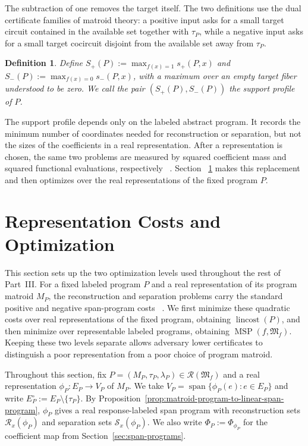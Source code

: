 \documentclass[11pt]{article}
\numberwithin{equation}{section}
\newtheorem{definition}{Definition}[section]
\theoremstyle{remark}
\begin{document}
The subtraction of one removes the target itself. The two definitions use
the dual certificate families of matroid theory: a positive input asks for a
small target circuit contained in the available set together with $\tau_P$,
while a negative input asks for a small target cocircuit disjoint from the
available set away from $\tau_P$.

\begin{definition}
\label{def:matroid-span-support-profile}
Define $S_+(P):=\max_{f(x)=1}s_+(P,x)$ and $S_-(P):=\max_{f(x)=0}s_-(P,x)$, with a maximum over an empty target fiber understood to be zero. We call the pair $(S_+(P),S_-(P))$ the \emph{support profile} of $P$.
\end{definition}

The support profile depends only on the labeled abstract program. It records
the minimum number of coordinates needed for reconstruction or separation,
but not the sizes of the coefficients in a real representation. After a
representation is chosen, the same two problems are measured by squared
coefficient mass and squared functional evaluations, respectively
~\cite{ReichardtSpalek2008,Reichardt2009}. Section
~\ref{sec:quantitative-representations} makes this replacement and then
optimizes over the real representations of the fixed program $P$.

\section{Representation Costs and Optimization}
\label{sec:quantitative-representations}

This section sets up the two optimization levels used throughout the rest of
Part~III. For a fixed labeled program $P$ and a real representation of its
program matroid $M_P$, the reconstruction and separation problems carry the
standard positive and negative span-program costs
~\cite{ReichardtSpalek2008,Reichardt2009,Reichardt2014Equivalent}. We first
minimize these quadratic costs over real representations of the fixed program,
obtaining $\operatorname{lincost}(P)$, and then minimize over representable
labeled programs, obtaining $\operatorname{MSP}(f,\mathfrak M_f)$. Keeping
these two levels separate allows adversary lower certificates to distinguish
a poor representation from a poor choice of program matroid.

Throughout this section, fix
$P=(M_P,\tau_P,\lambda_P)\in\mathscr R(\mathfrak M_f)$ and a real
representation $\phi_P:E_P\to V_P$ of $M_P$. We take
$V_P=\operatorname{span}\{\phi_P(e):e\in E_P\}$ and write
$E_P^\circ:=E_P\setminus\{\tau_P\}$. By
Proposition~\ref{prop:matroid-program-to-linear-span-program}, $\phi_P$
gives a real response-labeled span program with reconstruction sets
$\mathcal R_x(\phi_P)$ and separation sets $\mathcal S_x(\phi_P)$.
We also write $\Phi_P:=\Phi_{\phi_P}$ for the coefficient map from
Section~\ref{sec:span-programs}.
\end{document}
